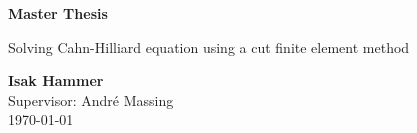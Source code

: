 \documentclass[11pt]{article}
\begin{document}
\begin{titlepage}
    \begin{center}
        \vspace*{1cm}

        \Huge
        \textbf{Master Thesis}

        \vspace{0.5cm}
        \Large
        Solving Cahn-Hilliard equation using a cut finite element method   \\


        \vspace{1.5cm}

        \textbf{Isak Hammer} \\
        \vspace{0.5cm}
        Supervisor: André Massing \\
        \vspace{0.5cm}
        \today


        \vfill

        \vspace{0.8cm}


\end{center}
\end{titlepage}
\end{document}
